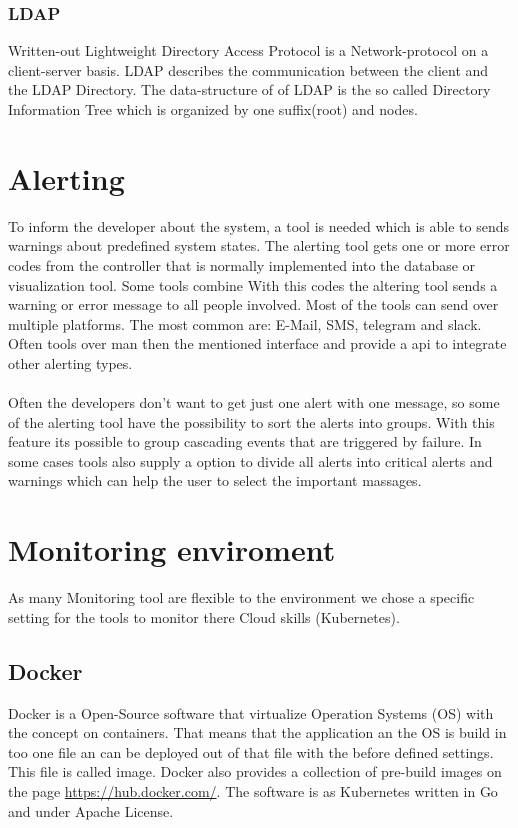\subsubsection{LDAP}
Written-out Lightweight Directory Access Protocol is a Network-protocol on a client-server basis. LDAP describes the communication between the client and the LDAP Directory. The data-structure of of LDAP is the so called Directory Information Tree which is organized by one suffix(root) and nodes.  

\section{Alerting}
To inform the developer about the system, a tool is needed which is able to sends warnings about predefined system states.
The alerting tool gets one or more error codes from the controller that is normally implemented into the database or visualization tool. Some tools combine With this codes the altering tool sends a warning or error message to all people involved. Most of the tools can send over multiple platforms. The most common are: E-Mail, SMS, telegram and slack. Often tools over man then the mentioned interface and provide a api to integrate other alerting types.\\
\\
Often the developers don’t want to get just one alert with one message, so some of the alerting tool have the possibility to sort the alerts into groups. With this feature its possible to group cascading events that are triggered by failure. In some cases tools also supply a option to divide all alerts into critical alerts and warnings which can help the user to select the important massages.  

\section{Monitoring enviroment}
As many Monitoring tool are flexible to the environment we chose a specific setting for the tools to monitor there Cloud skills (Kubernetes). \cite{Vohra2016} 
\subsection{Docker}
Docker is a Open-Source software that virtualize Operation Systems (OS) with the concept on containers. That means that the application an the OS is build in too one file an can be deployed out of that file with the before defined settings. This file is called image. Docker also provides a collection of pre-build images on the page \url{https://hub.docker.com/}. The software is as Kubernetes written in Go and under Apache License.

